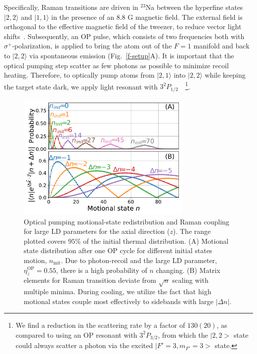 \documentclass[aps,prl,twocolumn,groupedaddress]{revtex4-1}
\begin{document}
Specifically, Raman transitions are driven in $^{23}$Na between the hyperfine states
$|2, 2\rangle$ and $|1, 1\rangle$ in the presence of an $8.8$ G magnetic field.
The external field is orthogonal to the effective magnetic field of the tweezer,
to reduce vector light shifts~\cite{Kaufman2012,Thompson2013}.
Subsequently, an OP pulse, which consists of two frequencies both with $\sigma^+$-polarization,
is applied to bring the atom out of the $F=1$ manifold and back to $|2, 2\rangle$
via spontaneous emission (Fig.~\ref{f-setup}A).
It is important that the optical pumping step scatter as few photons as possible to minimize recoil heating.
Therefore, to optically pump atoms from $|2, 1\rangle$ into $|2, 2\rangle$
while keeping the target state dark, we apply light resonant with $3^2P_{1/2}$~\cite{Monroe1995, Grobner2017}~\footnote{We find a reduction in the scattering rate by a factor of $130(20)$, as compared to using an OP resonant with $3^2P_{3/2}$, from which the $|2, 2>$ state could always scatter a photon via the excited $|F'=3, m_{F'}=3>$ state.}.

\begin{figure}[b]
  \includegraphics[width=8.5cm]{fig2_raman_op.pdf}
  \caption{Optical pumping motional-state redistribution and Raman coupling for large LD parameters for the axial direction ($z$). The range plotted covers $95$\% of the initial thermal distribution.
    (A) Motional state distribution after one OP cycle for different initial states motion,
    $n_{\textrm{init}}$. Due to photon-recoil and the large LD parameter, $\eta^{\textrm{OP}}_z=0.55$,
    there is a high probability of $n$ changing.
    (B) Matrix elements for Raman transition deviate from
    $\sqrt{n}$ scaling with multiple minima. During cooling, we utilize the fact that high motional states couple most effectively to sidebands with large $|\Delta n|$.
    \label{f-ld}}
\end{figure}
\end{document}
